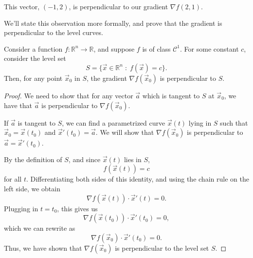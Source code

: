 \documentclass{ximera}
\begin{document}
\begin{example}
\begin{image}
\end{image}

This vector, $(-1,2)$, is perpendicular to our gradient $\nabla f(2,1)$.
\end{example}

We'll state this observation more formally, and prove that the gradient is perpendicular to the level curves.

\begin{theorem}
Consider a function $f:\mathbb{R}^n\rightarrow\mathbb{R}$, and suppose $f$ is of class $\mathcal{C}^1$. For some constant $c$, consider the level set
\[
S = \{\vec{x}\in\mathbb{R}^n\;:\;f(\vec{x})=c\}.
\]
Then, for any point $\vec{x}_0$ in $S$, the gradient $\nabla f(\vec{x}_0)$ is perpendicular to $S$.
\end{theorem} 

\begin{proof}
We need to show that for any vector $\vec{a}$ which is tangent to $S$ at $\vec{x}_0$, we have that $\vec{a}$ is perpendicular to $\nabla f(\vec{x}_0)$.

If $\vec{a}$ is tangent to $S$, we can find a parametrized curve $\vec{x}(t)$ lying in $S$ such that $\vec{x}_0=\vec{x}(t_0)$ and $\vec{x}'(t_0) = \vec{a}$. We will show that $\nabla f(\vec{x}_0)$ is perpendicular to $\vec{a} = \vec{x}'(t_0)$.

By the definition of $S$, and since $\vec{x}(t)$ lies in $S$, 
\[
f(\vec{x}(t))=c
\]
for all $t$. Differentiating both sides of this identity, and using the chain rule on the left side, we obtain
\[
\nabla f(\vec{x}(t))\cdot \vec{x}'(t) = 0.
\]
Plugging in $t=t_0$, this gives us
\[
\nabla f(\vec{x}(t_0))\cdot \vec{x}'(t_0) = 0,
\]
which we can rewrite as
\[
\nabla f(\vec{x}_0)\cdot \vec{x}'(t_0) = 0.
\]
Thus, we have shown that $\nabla f(\vec{x}_0)$ is perpendicular to the level set $S$.
\end{proof}
\end{document}
